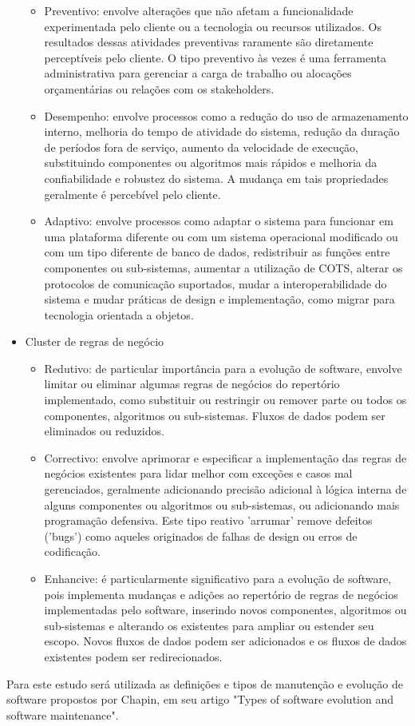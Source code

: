 \begin{itemize}
\begin{itemize}
        \item Preventivo: envolve alterações que não afetam a funcionalidade experimentada pelo cliente ou a tecnologia ou recursos utilizados. Os resultados dessas atividades preventivas raramente são diretamente perceptíveis pelo cliente. O tipo preventivo às vezes é uma ferramenta administrativa para gerenciar a carga de trabalho ou alocações orçamentárias ou relações com os stakeholders.
        \item Desempenho: envolve processos como a redução do uso de armazenamento interno, melhoria do tempo de atividade do sistema, redução da duração de períodos fora de serviço, aumento da velocidade de execução, substituindo componentes ou algoritmos mais rápidos e melhoria da confiabilidade e robustez do sistema. A mudança em tais propriedades geralmente é percebível pelo cliente.
        \item Adaptivo: envolve processos como adaptar o sistema para funcionar em uma plataforma diferente ou com um sistema operacional modificado ou com um tipo diferente de banco de dados, redistribuir as funções entre componentes ou sub-sistemas, aumentar a utilização de COTS, alterar os protocolos de comunicação suportados, mudar a interoperabilidade do sistema e mudar práticas de design e implementação, como migrar para tecnologia orientada a objetos.
    \end{itemize}
    \item Cluster de regras de negócio
    \begin{itemize}
        \item Redutivo: de particular importância para a evolução de software, envolve limitar ou eliminar algumas regras de negócios do repertório implementado, como substituir ou restringir ou remover parte ou todos os componentes, algoritmos ou sub-sistemas. Fluxos de dados podem ser eliminados ou reduzidos.
        \item Correctivo: envolve aprimorar e especificar a implementação das regras de negócios existentes para lidar melhor com exceções e casos mal gerenciados, geralmente adicionando precisão adicional à lógica interna de alguns componentes ou algoritmos ou sub-sistemas, ou adicionando mais programação defensiva. Este tipo reativo 'arrumar' remove defeitos ('bugs') como aqueles originados de falhas de design ou erros de codificação.
        \item Enhancive: é particularmente significativo para a evolução de software, pois implementa mudanças e adições ao repertório de regras de negócios implementadas pelo software, inserindo novos componentes, algoritmos ou sub-sistemas e alterando os existentes para ampliar ou estender seu escopo. Novos fluxos de dados podem ser adicionados e os fluxos de dados existentes podem ser redirecionados.
    \end{itemize}
\end{itemize}

Para este estudo será utilizada as definições e tipos de manutenção e evolução de software 
propostos por Chapin, em seu artigo "Types of software evolution and software maintenance".